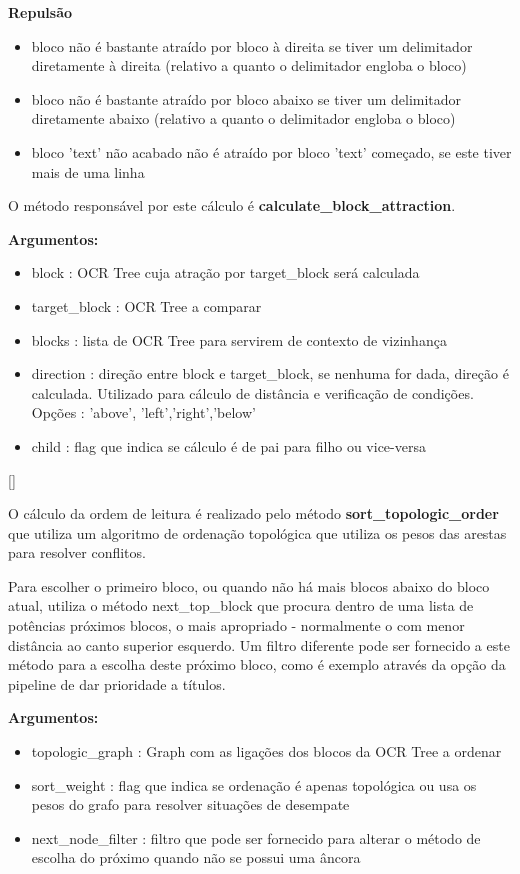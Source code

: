 \textbf{Repulsão}
\begin{itemize}\setlength\itemsep{-0.8em}
	\item bloco não é bastante atraído por bloco à direita se tiver um delimitador diretamente à direita (relativo a quanto o delimitador engloba o bloco)
	\item bloco não é bastante atraído por bloco abaixo se tiver um delimitador diretamente abaixo (relativo a quanto o delimitador engloba o bloco)
	\item bloco 'text' não acabado não é atraído por bloco 'text' começado, se este tiver mais de uma linha 
\end{itemize}

O método responsável por este cálculo é \textbf{calculate\_block\_attraction}.

\textbf{Argumentos:}
\begin{itemize}\setlength\itemsep{-0.3em}
	\vspace{-0.5em}
	\item block : OCR Tree cuja atração por target\_block será calculada
	\item target\_block : OCR Tree a comparar
	\item blocks : lista de OCR Tree para servirem de contexto de vizinhança
	\item direction : direção entre block e target\_block, se nenhuma for dada, direção é calculada. Utilizado para cálculo de distância e verificação de condições. Opções : 'above', 'left','right','below'
	\item child : flag que indica se cálculo é de pai para filho ou vice-versa
\end{itemize}



[\normalsize]

O cálculo da ordem de leitura é realizado pelo método \textbf{sort\_topologic\_order} que utiliza um algoritmo de ordenação topológica que utiliza os pesos das arestas para resolver conflitos.

Para escolher o primeiro bloco, ou quando não há mais blocos abaixo do bloco atual, utiliza o método next\_top\_block que procura dentro de uma lista de potências próximos blocos, o mais apropriado - normalmente o com menor distância ao canto superior esquerdo. Um filtro diferente pode ser fornecido a este método para a escolha deste próximo bloco, como é exemplo através da opção da pipeline de dar prioridade a títulos.

\textbf{Argumentos:}
\begin{itemize}\setlength\itemsep{-0.3em}
	\vspace{-0.5em}
	\item topologic\_graph : Graph com as ligações dos blocos da OCR Tree a ordenar
	\item sort\_weight : flag que indica se ordenação é apenas topológica ou usa os pesos do grafo para resolver situações de desempate
	\item next\_node\_filter : filtro que pode ser fornecido para alterar o método de escolha do próximo quando não se possui uma âncora
\end{itemize}

